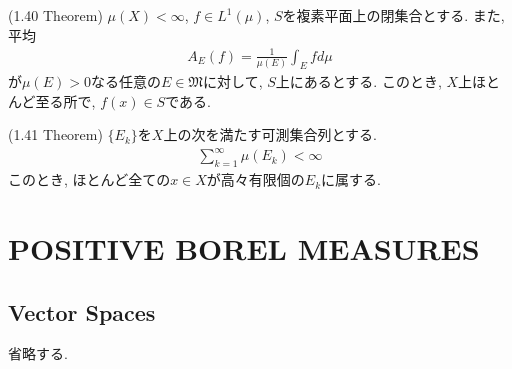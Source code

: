 \documentclass[a4paper]{jsarticle}
\begin{document}
\begin{thm}{(1.40 Theorem)}{}
    $\mu(X)<\infty$, $f\in L^1(\mu)$, $S$を複素平面上の閉集合とする. また, 平均
    \begin{align*}
        A_E(f) = \frac{1}{\mu(E)}\int_E fd\mu
    \end{align*}
    が$\mu(E)>0$なる任意の$E\in \mathfrak{M}$に対して, $S$上にあるとする. このとき, $X$上ほとんど至る所で, $f(x)\in S$である.
\end{thm}

\begin{thm}{(1.41 Theorem)}{}
    $\{E_k\}$を$X$上の次を満たす可測集合列とする.
    \begin{align*}
        \sum_{k=1}^\infty \mu(E_k) < \infty
    \end{align*}
    このとき, ほとんど全ての$x\in X$が高々有限個の$E_k$に属する.
\end{thm}


\section{POSITIVE BOREL MEASURES}
\subsection{Vector Spaces}
省略する.
\end{document}
